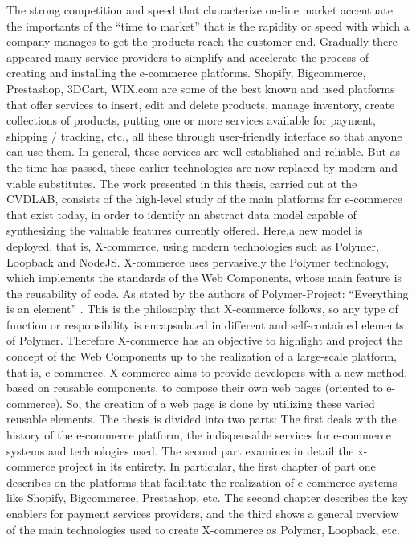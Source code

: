 The strong competition and speed that characterize on-line market
accentuate the importants of the “time to market” that is the rapidity or speed with which a company manages to get the products reach the customer end.
\newline
Gradually there appeared many service providers to simplify and accelerate the process of creating and installing the e-commerce platforms.
\newline
Shopify, Bigcommerce, Prestashop, 3DCart, WIX.com are some of the best known and used platforms that offer services to insert, edit and delete products, manage inventory, create collections of products, putting one or more services available for payment, shipping / tracking, etc., all these through user-friendly interface so that anyone can use them.
\newline
In general, these services are well established and reliable.
But as the time has passed, these earlier technologies are now replaced by modern and viable substitutes.
\newline
The work presented in this thesis, carried out at the CVDLAB, consists of the high-level study of the main platforms for e-commerce that exist today, in order to identify an abstract data model capable of synthesizing the valuable features currently offered. Here,a new model is deployed, that is, X-commerce, using modern technologies such as Polymer, Loopback and NodeJS.
\newline
X-commerce uses pervasively the Polymer technology, which implements the standards of the Web Components, whose main feature is the reusability of code. As stated by the authors of Polymer-Project: “Everything is an element” \cite{polymer_world_view}. This is the philosophy that X-commerce follows, so any type of function or responsibility is encapsulated in different and self-contained elements of Polymer. Therefore X-commerce has an objective to highlight and project the concept of the Web Components up to the realization of a large-scale platform, that is, e-commerce.
\newline
X-commerce aims to provide developers with a new method, based on reusable components, to compose their own web pages (oriented to e-commerce). So, the creation of a web page is done by utilizing these varied reusable elements.
\newline
The thesis is divided into two parts: The first deals with the history of the e-commerce platform, the indispensable services for e-commerce systems and technologies used. The second part examines in detail the x-commerce project in its entirety. In particular, the first chapter of part one describes on the platforms that facilitate the realization of e-commerce systems like Shopify, Bigcommerce, Prestashop, etc. The second chapter describes the key enablers for payment services providers, and the third shows a general overview of the main technologies used to create X-commerce as Polymer, Loopback, etc.
